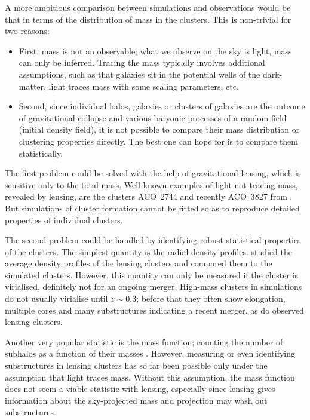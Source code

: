 \documentclass[
  11pt,
  twoside,
  openright,
  titlepage,
  headings=optiontoheadandtoc
]{scrbook}
\begin{document}
A more ambitious comparison between simulations and observations
would be that in terms of the distribution of mass in the clusters.
This is non-trivial for two reasons:

\begin{itemize}
\item First, mass is not an observable; what we observe on the sky is
  light, mass can only be inferred.  Tracing the mass typically
  involves additional assumptions, such as that galaxies sit in the
  potential wells of the dark-matter, light traces mass with some
  scaling parameters, etc.
\item Second, since individual halos, galaxies or clusters of
  galaxies are the outcome of gravitational collapse and various
  baryonic processes of a random field (initial density field), it is
  not possible to compare their mass distribution or clustering
  properties directly. The best one can hope for is to compare them
  statistically.
\end{itemize}

The first problem could be solved with the help of gravitational
lensing, which is sensitive only to the total mass.  Well-known examples of
light not tracing mass, revealed by lensing, are the clusters
ACO~2744 \citep{2011MNRAS.417..333M} and
recently ACO~3827 from \cite{2015MNRAS.449.3393M} \citep[see
  also][]{2011MNRAS.415..448W, 2014MNRAS.439.2651M}.  But simulations of
cluster formation cannot be fitted so as to reproduce detailed
properties of individual clusters.

The second problem could be handled by identifying robust statistical
properties of the clusters.  The simplest quantity is the radial
density profiles.  \cite{2013ApJ...765...24N,2013ApJ...765...25N}
studied the average density profiles of the lensing clusters and
compared them to the simulated clusters. However, this quantity can
only be measured if the cluster is virialised, definitely not for an
ongoing merger.  High-mass clusters in simulations do not usually
virialise until $z\sim0.3$; before that they often show elongation,
multiple cores and many substructures indicating a recent merger, as
do observed lensing clusters.

Another very popular statistic is the mass function; counting the
number of subhalos as a function of their masses
\citep{nat04,nat07,2015ApJ...800...18A}.  However, measuring or even
identifying substructures in lensing clusters has so far been
possible only under the assumption that light traces mass. Without
this assumption, the mass function does not seem a viable statistic
with lensing, especially since lensing gives information about the
sky-projected mass and projection may wash out substructures.
\end{document}
